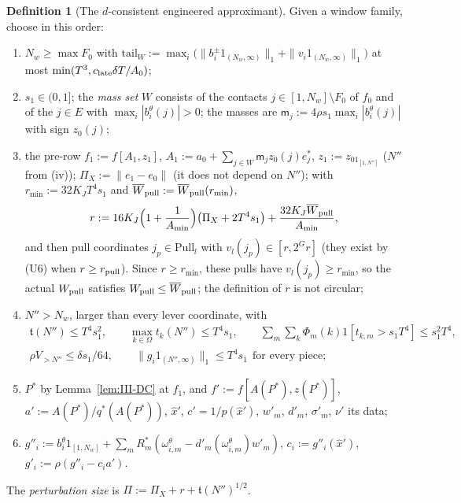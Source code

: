 \documentclass[10pt]{amsart}
\theoremstyle{definition}
\newtheorem{definition}[theorem]{Definition}
\theoremstyle{remark}
\begin{document}
\begin{definition}[The $d$-consistent engineered approximant]\label{def:III-approx}
Given a window family, choose in this order:
\begin{enumerate}
\item[(i)] $N_w\ge\max F_0$ with
$\mathrm{tail}_W:=\max_i\big(\|b^\pm_i1_{(N_w,\infty)}\|_1+\|v_i1_{(N_w,\infty)}\|_1\big)$
at most $\min(T^3,c_{\rm late}\delta T/A_0)$;
\item[(ii)] $s_1\in(0,1]$; the \emph{mass set} $W$ consists of the contacts
$j\in[1,N_w]\setminus F_0$ of $f_0$ and of the $j\in E$ with
$\max_i|b^\theta_i(j)|>0$; the masses are $\mathsf m_j:=4\rho s_1\max_i
|b^\theta_i(j)|$ with sign $z_0(j)$;
\item[(iii)] the pre-row $f_1:=f[A_1,z_1]$, $A_1:=a_0+\sum_{j\in W}\mathsf m_j
z_0(j)e^*_j$, $z_1:=z_01_{[1,N'']}$ ($N''$ from (iv)); $\Pi_X:=\|e_1-e_0\|$
(it does not depend on $N''$); with $r_{\min}:=32K_JT^4s_1$ and
$\overline W_{\rm pull}:=\overline W_{\rm pull}(r_{\min})$,
\[
 r:=16K_J\Big(1+\frac1{A_{\min}}\Big)\big(\Pi_X+2T^4s_1\big)+\frac{32K_J
 \overline W_{\rm pull}}{A_{\min}},
\]
and then pull coordinates $j_p\in\mathrm{Pull}_l$ with $v_l(j_p)\in[r,2^Gr]$
\textup{(}they exist by (U6) when $r\ge r_{\rm pull}$\textup{)}.  Since $r\ge
r_{\min}$, these pulls have $v_l(j_p)\ge r_{\min}$, so the actual
$W_{\rm pull}$ satisfies $W_{\rm pull}\le\overline W_{\rm pull}$; the
definition of $r$ is not circular;
\item[(iv)] $N''>N_w$, larger than every lever coordinate, with
\begin{gather*}
 \mathfrak t(N'')\le T^4s_1^2,\qquad\max_{k\in\Omega}t_k(N'')\le T^4s_1,\qquad
 \sum_m\sum_k\Phi_m(k)1[t_{k,m}>s_1T^4]\le s_1^2T^4,\\
 \rho V_{>N''}\le\delta s_1/64,\qquad\|g_i1_{(N'',\infty)}\|_1\le T^4s_1\ \
 \text{for every piece};
\end{gather*}
\item[(v)] $P^*$ by Lemma~\ref{lem:III-DC} at $f_1$, and $f':=f[A(P^*),z(P^*)]$,
$a':=A(P^*)/q^*(A(P^*))$, $\hat x'$, $c'=1/p(\hat x')$, $w'_m$, $d'_m$,
$\sigma'_m$, $\nu'$ its data;
\item[(vi)] $g''_i:=b^\theta_i1_{[1,N_w]}+\sum_mR_m^*(\omega^\theta_{i,m}-
d'_m(\omega^\theta_{i,m})w'_m)$, $c_i:=g''_i(\hat x')$, $g'_i:=\rho(g''_i-c_ia')$.
\end{enumerate}
The \emph{perturbation size} is $\Pi:=\Pi_X+r+\mathfrak t(N'')^{1/2}$.
\end{definition}
\end{document}
